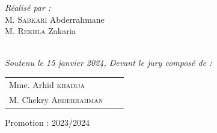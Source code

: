 \documentclass[a4paper,12pt]{report}
\begin{document}
\begin{titlepage}
  \noindent
  \begin{minipage}{0.5\textwidth}
    \begin{flushleft} \large
      \emph{Réalisé par :}\\
      M. \textsc{Sabkari} Abderrahmane \\
      M. \textsc{Rekhla} Zakaria \\
    \end{flushleft}
  \end{minipage}
  \begin{minipage}{0.45\textwidth}
    \begin{flushright} \large
      \begin{flushleft} \large
      \end{flushleft}

    \end{flushright}
  \end{minipage}\\[1cm]

  {\large \textit{Soutenu le 15 janvier 2024, Devant le jury composé de : }}\\[0.5cm]

  \centering
  \begin{tabular}{lll}
    \large Mme. Arhid \textsc{khadija} \\[0.1cm]
    \large M. Chekry \textsc{Abderrahman}
  \end{tabular}

  \vspace{40mm}
  {\large Promotion : 2023/2024}

\end{titlepage}
\end{document}
